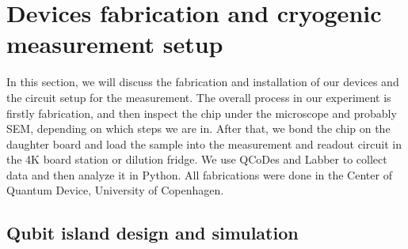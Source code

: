 \clearpage
\section{Devices fabrication and cryogenic measurement setup}

In this section, we will discuss the fabrication and installation of our devices and the circuit setup for the measurement. The overall process in our experiment is firstly fabrication, and then inspect the chip under the microscope and probably SEM, depending on which steps we are in. After that, we bond the chip on the daughter board and load the sample into the measurement and readout circuit in the 4K board station or dilution fridge. We use QCoDes and Labber to collect data and then analyze it in Python. All fabrications were done in the Center of Quantum Device, University of Copenhagen.

\subsection{Qubit island design and simulation}
